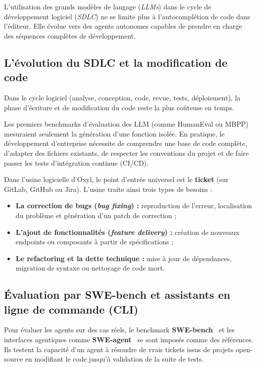 \documentclass{tnreport}
\begin{document}
L'utilisation des grands modèles de langage (\textit{LLMs}) dans le cycle de développement logiciel (\textit{SDLC}) ne se limite plus à l'autocomplétion de code dans l'éditeur. Elle évolue vers des agents autonomes capables de prendre en charge des séquences complètes de développement.

\subsection{L'évolution du SDLC et la modification de code}
\label{subsec:evolution_sdlc}

Dans le cycle logiciel (analyse, conception, code, revue, tests, déploiement), la phase d'écriture et de modification du code reste la plus coûteuse en temps.

Les premiers benchmarks d'évaluation des LLM (comme HumanEval ou MBPP) mesuraient seulement la génération d'une fonction isolée. En pratique, le développement d'entreprise nécessite de comprendre une base de code complète, d'adapter des fichiers existants, de respecter les conventions du projet et de faire passer les tests d'intégration continue (CI/CD).

Dans l'usine logicielle d'Oxyl, le point d'entrée universel est le \textbf{ticket} (sur GitLab, GitHub ou Jira). L'usine traite ainsi trois types de besoins :
\begin{itemize}
    \item \textbf{La correction de bugs (\textit{bug fixing}) :} reproduction de l'erreur, localisation du problème et génération d'un patch de correction ;
    \item \textbf{L'ajout de fonctionnalités (\textit{feature delivery}) :} création de nouveaux endpoints ou composants à partir de spécifications ;
    \item \textbf{Le refactoring et la dette technique :} mise à jour de dépendances, migration de syntaxe ou nettoyage de code mort.
\end{itemize}

\subsection{Évaluation par SWE-bench et assistants en ligne de commande (CLI)}
\label{subsec:swebench_cli}

Pour évaluer les agents sur des cas réels, le benchmark \textbf{SWE-bench}~\cite{jimenez2023swebench} et les interfaces agentiques comme \textbf{SWE-agent}~\cite{yang2024sweagent} se sont imposés comme des références. Ils testent la capacité d'un agent à résoudre de vrais tickets issus de projets open-source en modifiant le code jusqu'à validation de la suite de tests.
\end{document}
